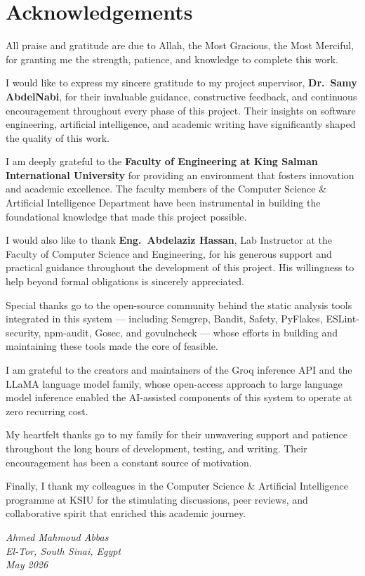 \chapter*{Acknowledgements}
\thispagestyle{plain}

All praise and gratitude are due to Allah, the Most Gracious, the Most Merciful, for granting me the strength, patience, and knowledge to complete this work.

I would like to express my sincere gratitude to my project supervisor, \textbf{Dr.\ Samy AbdelNabi}, for their invaluable guidance, constructive feedback, and continuous encouragement throughout every phase of this project. Their insights on software engineering, artificial intelligence, and academic writing have significantly shaped the quality of this work.

I am deeply grateful to the \textbf{Faculty of Engineering at King Salman International University} for providing an environment that fosters innovation and academic excellence. The faculty members of the Computer Science \& Artificial Intelligence Department have been instrumental in building the foundational knowledge that made this project possible.

I would also like to thank \textbf{Eng.\ Abdelaziz Hassan}, Lab Instructor at the Faculty of Computer Science and Engineering, for his generous support and practical guidance throughout the development of this project. His willingness to help beyond formal obligations is sincerely appreciated.

Special thanks go to the open-source community behind the static analysis tools integrated in this system --- including Semgrep, Bandit, Safety, PyFlakes, ESLint-security, npm-audit, Gosec, and govulncheck --- whose efforts in building and maintaining these tools made the core of \ACRQA{} feasible.

I am grateful to the creators and maintainers of the Groq inference API and the LLaMA language model family, whose open-access approach to large language model inference enabled the AI-assisted components of this system to operate at zero recurring cost.

My heartfelt thanks go to my family for their unwavering support and patience throughout the long hours of development, testing, and writing. Their encouragement has been a constant source of motivation.

Finally, I thank my colleagues in the Computer Science \& Artificial Intelligence programme at KSIU for the stimulating discussions, peer reviews, and collaborative spirit that enriched this academic journey.

\vspace{1cm}
\begin{flushright}
  \textit{Ahmed Mahmoud Abbas}\\
  \textit{El-Tor, South Sinai, Egypt}\\
  \textit{May 2026}
\end{flushright}

\clearpage
